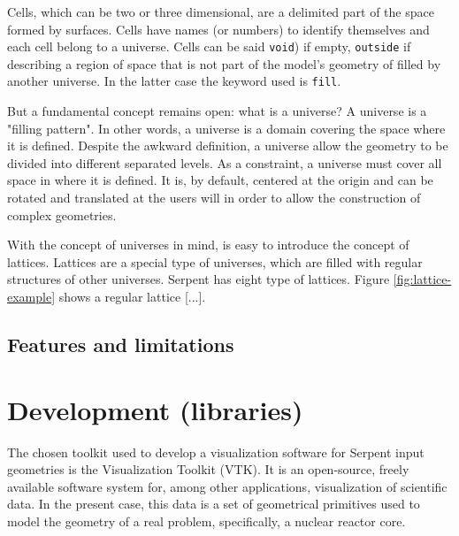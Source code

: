 \documentclass{elsarticle}
\begin{document}
Cells, which can be two or three dimensional, are a delimited part of the space 
formed by surfaces. Cells have names (or numbers) to identify themselves and 
each cell belong to a universe. Cells can be said \texttt{void}) if 
empty, \texttt{outside} if describing a region of space that is not part 
of the model's geometry of filled by another universe. In the latter case the 
keyword used is \texttt{fill}.

But a fundamental concept remains open: what is a universe? A universe is a "filling pattern". In other words, a universe is a domain covering the space where it is defined. Despite the awkward definition, a universe allow the geometry to 
be divided into different separated levels. As a constraint, a universe must 
cover all space in where it is defined. It is, by default, centered at the 
origin and can be rotated and translated at the users will in order to allow 
the construction of complex geometries.

With the concept of universes in mind, is easy to introduce the concept of 
lattices. Lattices are a special type of universes, which are filled with 
regular structures of other universes. Serpent has eight type of lattices. 
Figure \ref{fig:lattice-example} shows a regular lattice [...].




\subsection{Features and limitations}

\section{Development (libraries)}

The chosen toolkit used to develop a visualization software for Serpent input 
geometries is the Visualization Toolkit (VTK)\cite{vtk}. It is an open-source, 
freely available software system for, among other applications, visualization of 
scientific data. In the present case, this data is a set of geometrical 
primitives used to model the geometry of a real problem, specifically, a 
nuclear reactor core.
\end{document}
